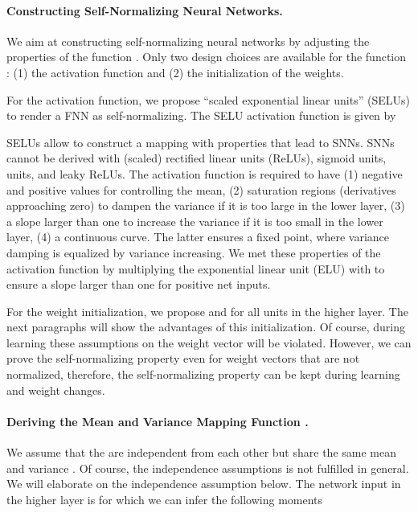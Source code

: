 \documentclass{article}
\begin{document}
\paragraph{Constructing Self-Normalizing Neural Networks.}
We aim at constructing self-normalizing
neural networks by adjusting the properties of the function .
Only two design choices are available for the
function : 
(1) the activation function and 
(2) the initialization of the weights.

For the activation function,
we propose ``scaled exponential linear units'' (SELUs) to render a FNN
as self-normalizing. The SELU activation function is given by 

SELUs allow to construct a mapping  with properties that lead to SNNs.
SNNs cannot be derived with (scaled)
rectified linear units (ReLUs), sigmoid units,  units, and leaky
ReLUs.
The activation function is required to have 
(1) negative and positive values for controlling the mean,
(2) saturation regions (derivatives approaching zero) to dampen the variance if
it is too large in the lower layer, 
(3) a slope larger than one to increase the variance if
it is too small in the lower layer,
(4) a continuous curve. 
The latter ensures a fixed point, where variance damping is equalized by variance increasing.
We met these properties of the activation function by multiplying the exponential linear
unit (ELU) \citep{bib:Clevert2015} with  to ensure a slope larger than one
for positive net inputs. 

For the weight initialization, we 
propose  and  for all units in the higher layer.
The next paragraphs will show the advantages of this initialization. 
Of course, during learning these assumptions on the weight vector will
be violated. However, we can prove the self-normalizing property
even for weight vectors that are not normalized, therefore, the 
self-normalizing property can be kept during learning and weight changes.



\paragraph{Deriving the Mean and Variance Mapping Function .}
We assume that the  are independent from each other but share
the same mean  and variance . 
Of course, the independence assumptions is 
not fulfilled in general. We will elaborate on the independence
assumption below.  
The network input  in the higher layer 
is  for which we can infer the following moments 
\end{document}
